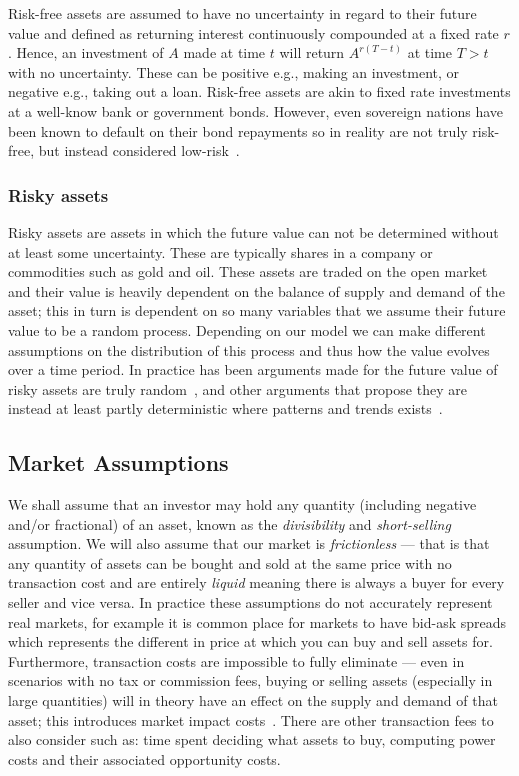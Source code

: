 Risk-free assets are assumed to have no uncertainty in regard to their future value and defined as returning interest continuously compounded at a fixed rate \(r\). Hence, an investment of \(A\) made at time \(t\) will return \(A^{r\left(T-t\right)}\) at time \(T>t\) with no uncertainty. These can be positive e.g., making an investment, or negative e.g., taking out a loan. Risk-free assets are akin to fixed rate investments at a well-know bank or government bonds. However, even sovereign nations have been known to default on their bond repayments so in reality are not truly risk-free, but instead considered low-risk~\cite{kitanov2015risk}.

\subsubsection{Risky assets}

Risky assets are assets in which the future value can not be determined without at least some uncertainty. These are typically shares in a company or commodities such as gold and oil. These assets are traded on the open market and their value is heavily dependent on the balance of supply and demand of the asset; this in turn is dependent on so many variables that we assume their future value to be a random process. Depending on our model we can make different assumptions on the distribution of this process and thus how the value evolves over a time period. In practice has been arguments made for the future value of risky assets are truly random~\cite{RandomWalkFama}, and other arguments that propose they are instead at least partly deterministic where patterns and trends exists~\cite{shiller}.

\subsection{Market Assumptions}

We shall assume that an investor may hold any quantity (including negative and/or fractional) of an asset, known as the \textit{divisibility} and \textit{short-selling} assumption. We will also assume that our market is \textit{frictionless} --- that is that any quantity of assets can be bought and sold at the same price with no transaction cost and are entirely \textit{liquid} meaning there is always a buyer for every seller and vice versa.
\nline{}
In practice these assumptions do not accurately represent real markets, for example it is common place for markets to have bid-ask spreads which represents the different in price at which you can buy and sell assets for. Furthermore, transaction costs are impossible to fully eliminate --- even in scenarios with no tax or commission fees, buying or selling assets (especially in large quantities) will in theory have an effect on the supply and demand of that asset; this introduces market impact costs~\cite{moro2009market}. There are other transaction fees to also consider such as: time spent deciding what assets to buy, computing power costs and their associated opportunity costs.

